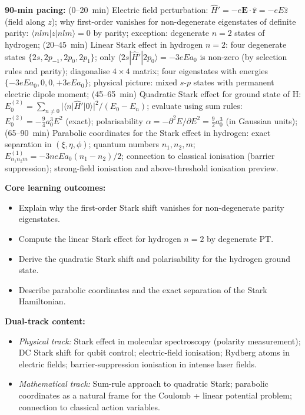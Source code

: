 \documentclass[11pt,a4paper]{article}
\begin{document}
\begin{tcolorbox}[modulebox, title={Module~I.4 / L07: Stark Effect}]
\textbf{90-min pacing:} (0--20~min) Electric field perturbation:
$\hat{H}'=-e\mathbf{E}\cdot\hat{\mathbf{r}}=-eE\hat{z}$ (field along $z$);
why first-order vanishes for non-degenerate eigenstates of definite parity:
$\langle nlm|z|nlm\rangle=0$ by parity;
exception: degenerate $n=2$ states of hydrogen;
(20--45~min) Linear Stark effect in hydrogen $n=2$:
four degenerate states $\{2s,2p_{-1},2p_0,2p_1\}$;
only $\langle 2s|\hat{H}'|2p_0\rangle=-3eEa_0$ is non-zero (by selection rules and parity);
diagonalise $4\times4$ matrix; four eigenstates with energies $\{-3eEa_0,0,0,+3eEa_0\}$;
physical picture: mixed $s$-$p$ states with permanent electric dipole moment;
(45--65~min) Quadratic Stark effect for ground state of H:
$E^{(2)}_0=\sum_{n\neq 0}|\langle n|\hat{H}'|0\rangle|^2/(E_0-E_n)$;
evaluate using sum rules: $E^{(2)}_0=-\tfrac{9}{4}a_0^3E^2$ (exact);
polarisability $\alpha=-\partial^2 E/\partial E^2=\tfrac{9}{2}a_0^3$ (in Gaussian units);
(65--90~min) Parabolic coordinates for the Stark effect in hydrogen:
exact separation in $(\xi,\eta,\phi)$; quantum numbers $n_1,n_2,m$;
$E_{n_1 n_2 m}^{(1)}=-3neEa_0(n_1-n_2)/2$; connection to classical ionisation (barrier suppression);
strong-field ionisation and above-threshold ionisation preview.

\medskip\textbf{Core learning outcomes:}
\begin{itemize}[leftmargin=1.4em,topsep=2pt,itemsep=1pt]
  \item Explain why the first-order Stark shift vanishes for non-degenerate parity eigenstates.
  \item Compute the linear Stark effect for hydrogen $n=2$ by degenerate PT.
  \item Derive the quadratic Stark shift and polarisability for the hydrogen ground state.
  \item Describe parabolic coordinates and the exact separation of the Stark Hamiltonian.
\end{itemize}

\medskip\textbf{Dual-track content:}
\begin{itemize}[leftmargin=1.4em,topsep=2pt,itemsep=1pt]
  \item \textit{Physical track:} Stark effect in molecular spectroscopy (polarity measurement);
    DC Stark shift for qubit control; electric-field ionisation; Rydberg atoms in electric fields;
    barrier-suppression ionisation in intense laser fields.
  \item \textit{Mathematical track:} Sum-rule approach to quadratic Stark; parabolic coordinates as
    a natural frame for the Coulomb + linear potential problem; connection to classical action variables.
\end{itemize}


\end{tcolorbox}
\end{document}
